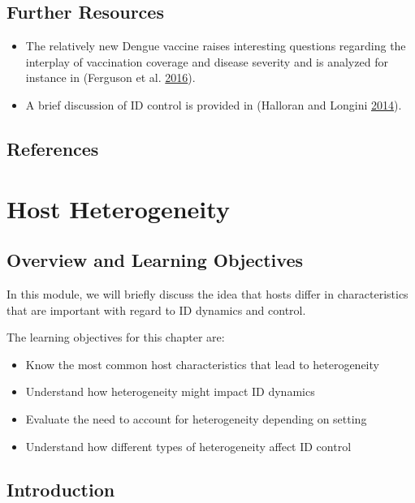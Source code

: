 \documentclass[]{article}
\providecommand{\tightlist}{%
  \setlength{\itemsep}{0pt}\setlength{\parskip}{0pt}}
\theoremstyle{definition}
\theoremstyle{definition}
\theoremstyle{definition}
\theoremstyle{remark}
\begin{document}
\subsection{Further Resources}\label{further-resources-8}

\begin{itemize}
\tightlist
\item
  The relatively new Dengue vaccine raises interesting questions
  regarding the interplay of vaccination coverage and disease severity
  and is analyzed for instance in (Ferguson et al.
  \protect\hyperlink{ref-ferguson16}{2016}).
\item
  A brief discussion of ID control is provided in (Halloran and Longini
  \protect\hyperlink{ref-halloran14}{2014}).
\end{itemize}

\subsection{References}\label{references-9}

\section{Host Heterogeneity}\label{host-heterogeneity}

\subsection{Overview and Learning
Objectives}\label{overview-and-learning-objectives-9}

In this module, we will briefly discuss the idea that hosts differ in
characteristics that are important with regard to ID dynamics and
control.

The learning objectives for this chapter are:

\begin{itemize}
\tightlist
\item
  Know the most common host characteristics that lead to heterogeneity
\item
  Understand how heterogeneity might impact ID dynamics
\item
  Evaluate the need to account for heterogeneity depending on setting
\item
  Understand how different types of heterogeneity affect ID control
\end{itemize}

\subsection{Introduction}\label{introduction-9}
\end{document}
